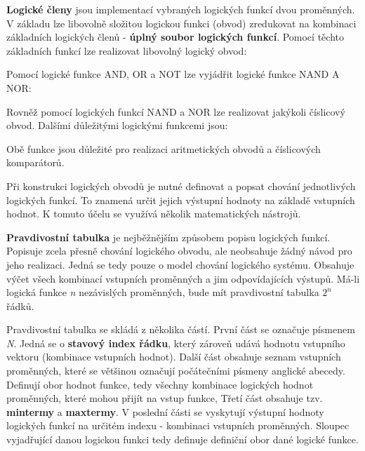 {\bf Logické členy} jsou implementací vybraných logických funkcí dvou proměnných. V základu lze libovolně složitou logickou funkci (obvod) zredukovat na kombinaci základních logických členů -  {\bf úplný soubor logických funkcí}. Pomocí těchto základních funkcí lze realizovat libovolný logický obvod:

\vskip 4mm
\vskip 4mm

Pomocí logické funkce AND, OR a NOT lze vyjádřit logické funkce NAND A NOR:

\vskip 4mm
\vskip 4mm

Rovněž pomocí logických funkcí NAND a NOR lze realizovat jakýkoli číslicový obvod. Dalšími důležitými logickými funkcemi jsou:
\vskip 4mm 
\vskip 4mm

Obě funkce jsou důležité pro realizaci aritmetických obvodů a číslicových komparátorů.


Při konstrukci logických obvodů je nutné definovat a popsat chování jednotlivých logických funkcí. To znamená určit jejich výstupní hodnoty na základě vstupních hodnot. K tomuto účelu se využívá několik matematických nástrojů.


{\bf Pravdivostní tabulka} je nejběžnějším způsobem popisu logických funkcí. Popisuje zcela přesně chování logického obvodu, ale neobsahuje žádný návod pro jeho realizaci. Jedná se tedy pouze o model chování logického systému. Obsahuje výčet všech kombinací vstupních proměnných a jim odpovídajících výstupů. Má-li logická funkce {\it n} nezávislých proměnných, bude mít pravdivostní tabulka $2^n$ řádků.

Pravdivostní tabulka se skládá z několika částí. První část se označuje písmenem {\it N}. Jedná se o {\bf stavový index řádku}, který zároveň udává hodnotu vstupního vektoru (kombinace vstupních hodnot). Další část obsahuje seznam vstupních proměnných, které se většinou označují počátečními písmeny anglické abecedy. Definují obor hodnot funkce, tedy všechny kombinace logických hodnot proměnných, které mohou přijít na vstup funkce, Třetí část obsahuje tzv. {\bf mintermy} a {\bf maxtermy}. V poslední části se vyskytují výstupní hodnoty logických funkcí na určitém indexu - kombinaci vstupních proměnných. Sloupec vyjadřující danou logickou funkci tedy definuje definiční obor dané logické funkce.


